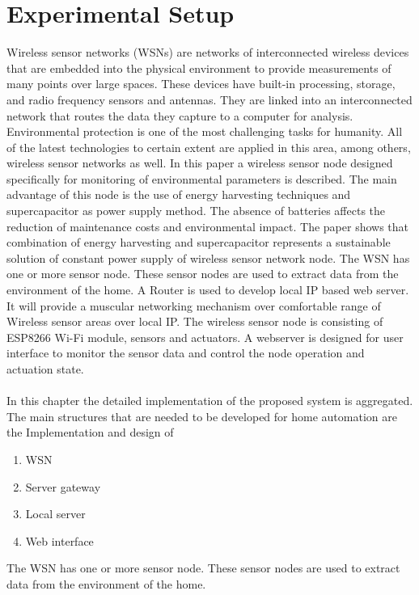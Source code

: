 \chapter{\textbf{Experimental Setup}}
Wireless sensor networks (WSNs) are networks of interconnected wireless devices that are embedded into the physical environment to provide measurements of many points over large spaces. These devices have built-in processing, storage, and radio frequency sensors and antennas. They are linked into an interconnected network that routes the data they capture to a computer for analysis.\\
Environmental protection is one of the most challenging tasks for humanity. All of the latest technologies to certain extent are applied in this area, among others, wireless sensor networks as well. In this paper a wireless sensor node designed specifically for monitoring of environmental parameters is described. The main advantage of this node is the use of energy harvesting techniques and supercapacitor as power supply method. The absence of batteries affects the reduction of maintenance costs and environmental impact. The paper shows that combination of energy harvesting and supercapacitor represents a sustainable solution of constant power supply of wireless sensor network node.
The WSN has one or more sensor node. These sensor nodes are used to extract data from the environment of the home. A Router is used to develop local IP based web server. It will provide a muscular networking mechanism over comfortable range of Wireless sensor areas over local IP. The wireless sensor node is consisting of ESP8266 Wi-Fi module, sensors and actuators. A webserver is designed for user interface to monitor the sensor data and control the node operation and actuation state.\\\\
In this chapter the detailed implementation of the proposed system is aggregated. The main structures that are needed to be developed for home automation are the Implementation and design of
\begin{enumerate}
\item	WSN
\item Server gateway
\item Local server
\item Web interface
\end{enumerate}
The WSN has one or more sensor node. These sensor nodes are used to extract data from the environment of the home.
\clearpage
